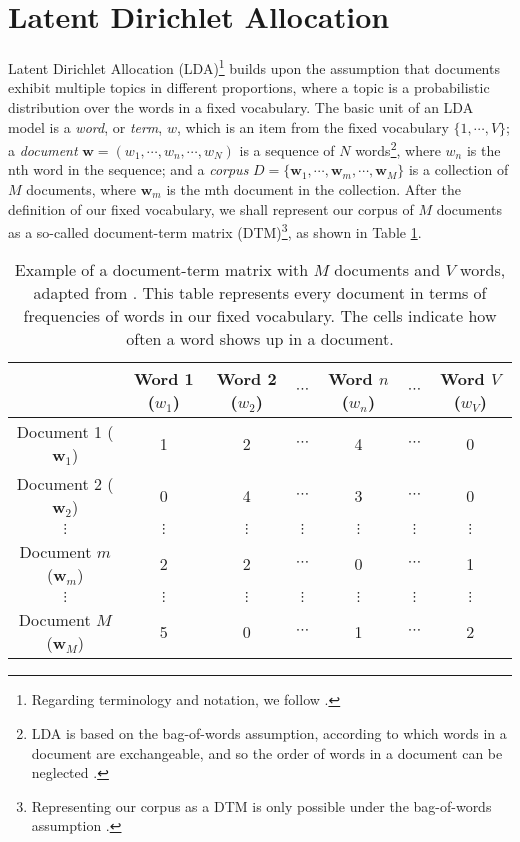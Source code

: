 \section{Latent Dirichlet Allocation} \label{LDA}

Latent Dirichlet Allocation (LDA)\footnote{Regarding terminology and notation, we follow \cite{blei_latent_2003}.} builds upon the assumption that documents exhibit multiple topics in different proportions, where a topic is a probabilistic distribution over the words in a fixed vocabulary. The basic unit of an LDA model is a \textit{word}, or \textit{term}, $w$, which is an item from the fixed vocabulary $\{1, \cdots, V \}$; a \textit{document} $\mathbf{w} = (w_{1}, \cdots, w_{n}, \cdots, w_{N})$ is a sequence of $N$ words\footnote{LDA is based on the bag-of-words assumption, according to which words in a document are exchangeable, and so the order of words in a document can be neglected \citep{blei_latent_2003}.}, where $w_{n}$ is the nth word in the sequence; and a \textit{corpus} $D = \{ \mathbf{w}_{1}, \cdots, \mathbf{w}_{m}, \cdots, \mathbf{w}_{M} \}$ is a collection of $M$ documents, where $\mathbf{w}_{m}$ is the mth document in the collection. After the definition of our fixed vocabulary, we shall represent our corpus of $M$ documents as a so-called document-term matrix (DTM)\footnote{Representing our corpus as a DTM is only possible under the bag-of-words assumption \citep{ponweiser_latent_2012}.}, as shown in Table \ref{tab:dtm}.

\begin{table}[ht!]
	\centering
	\begin{tabular}{c|cccccc}
           		        & Word 1 ($w_{1}$) & Word 2 ($w_{2}$) & $\cdots$ & Word $n$ ($w_{n}$) & $\cdots$ & Word $V$ ($w_{V}$) \\ \hline
Document 1 ($\mathbf{w}_{1}$) & 1 & 2 & $\cdots$ & 4 & $\cdots$ & 0 \\
Document 2 ($\mathbf{w}_{2}$) & 0 & 4 & $\cdots$ & 3 & $\cdots$ & 0 \\
$\vdots$ & $\vdots$ & $\vdots$ & $\vdots$ & $\vdots$ & $\vdots$ & $\vdots$ \\
Document $m$ ($\mathbf{w}_{m}$) & 2 & 2 & $\cdots$ & 0 & $\cdots$ & 1 \\
$\vdots$ & $\vdots$ & $\vdots$ & $\vdots$ & $\vdots$ & $\vdots$ & $\vdots$ \\
Document $M$ ($\mathbf{w}_{M}$) & 5 & 0 & $\cdots$ & 1 & $\cdots$ & 2
	\end{tabular}
	\caption{Example of a document-term matrix with $M$ documents and $V$ words, adapted from \cite{ponweiser_latent_2012}. This table represents every document in terms of frequencies of words in our fixed vocabulary. The cells indicate how often a word shows up in a document.}
	\label{tab:dtm}
\end{table}

